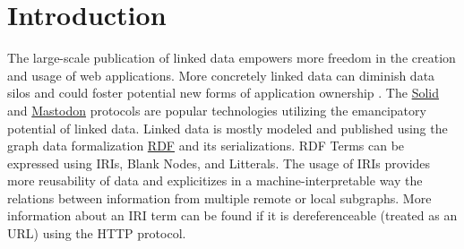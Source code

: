 
\section{Introduction}
 
The large-scale publication of linked data empowers more freedom in the creation and usage of web applications.
More concretely linked data can diminish data silos \cite{Verstraete2022}
and could foster potential new forms of application ownership \cite{Mechant2021}.
The \href{https://solidproject.org/TR/protocol}{Solid} and
\href{https://docs.joinmastodon.org/}{Mastodon} protocols
are popular technologies utilizing the emancipatory potential of linked data.
Linked data is mostly modeled and published using the graph data formalization \href{https://www.w3.org/TR/rdf12-concepts/}{RDF} and its serializations.
RDF Terms can be expressed using IRIs, Blank Nodes, and Litterals.
The usage of IRIs provides more reusability of data and explicitizes in a machine-interpretable way the relations between
information from multiple remote or local subgraphs.
More information about an IRI term can be found if it is dereferenceable (treated as an URL) using the HTTP protocol.

